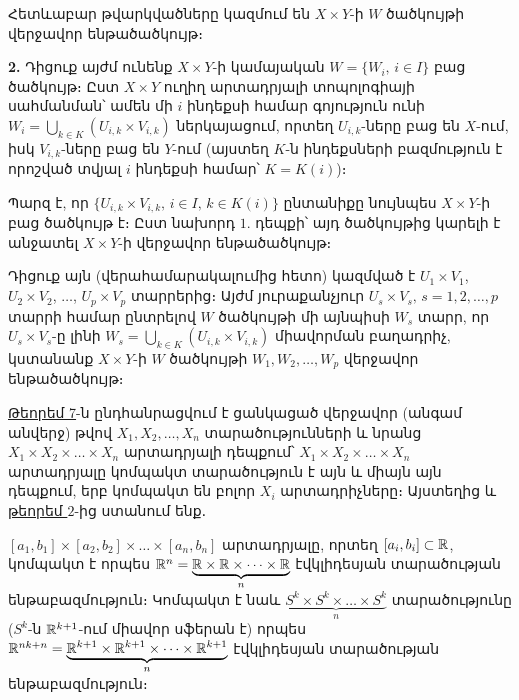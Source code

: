 \documentclass[./main.tex]{subfiles}
\begin{document}
\begin{varproof}
\par Հետևաբար թվարկվածները կազմում են $X \times Y$-ի $W$ ծածկույթի վերջավոր են\-թա\-ծածկույթ։

\par \textbf{2.} Դիցուք այժմ ունենք $X\times Y$-ի կամայական $W=\{ W_i,\, i\in I\}$ բաց ծածկույթ։ Ըստ $X\times Y$ ուղիղ արտադրյալի տոպոլոգիայի սահմանման՝ ամեն մի $i$ ինդեքսի համար գոյություն ունի $W_i=\bigcup\limits_{k\in K}(U_{i,k}\times V_{i,k})$ ներկայացում, որտեղ $U_{i,k}$-ները բաց են $X$-ում, իսկ $V_{i,k}$-ները բաց են $Y$-ում (այստեղ $K$-ն ինդեքսների բազմություն է որոշված տվյալ $i$ ինդեքսի համար՝ $K=K(i)$)։
\par Պարզ է, որ $\{U_{i,k}\times V_{i,k},\, i\in I,\, k\in K(i)\}$ ընտանիքը նույնպես $X\times Y$-ի բաց ծածկույթ է։ Ըստ նախորդ $1.$ դեպքի՝ այդ ծածկույթից կարելի է անջատել $X\times Y$-ի վերջավոր ենթածածկույթ։ 
\par Դիցուք այն (վերահամարակալումից հետո) կազմված է $U_1\times V_1$, $U_2\times V_2$, $\dots$, ${U_p\times V_p}$ տարրերից։ Այժմ յուրաքանչյուր $U_s\times V_s,\, s=1,2,\dots,p$ տարրի համար ընտ\-րե\-լով $W$ ծածկույթի մի այնպիսի $W_s$ տարր, որ $U_s\times V_s$-ը լինի ${W_s=\bigcup\limits_{k\in K}(U_{i,k}\times V_{i,k})}$ միա\-վորման բաղադրիչ, կստանանք $X\times Y$-ի $W$ ծածկույթի $W_1, W_2, \dots, W_p$ վեր\-ջա\-վոր ենթածածկույթ։
\end{varproof}

\par \hyperref[թեորեմ 7]{Թեորեմ 7}-ն ընդհանրացվում է ցանկացած վերջավոր (անգամ անվերջ) թվով $X_1,X_2,\dots,X_n$ տարածությունների և նրանց $X_1\times X_2\times \dots\times X_n $ արտադրյալի դեպքում՝ $X_1\times X_2\times \dots\times X_n$ արտադրյալը կոմպակտ տարածություն է այն և միայն այն դեպքում, երբ կոմպակտ են բոլոր $X_i$ արտադրիչները։ Այստեղից և \hyperref[թեորեմ 2]{թեորեմ $2$}-ից ստանում ենք․
\begin{hetevanq}\label{ch16cor4}
$[a_1,b_1]\times [a_2,b_2]\times \dots \times [a_n,b_n]$ արտադրյալը, որտեղ $[a_i,b_i]\subset \mathbb{R}$, կոմպակտ է որպես $\mathbb{R}^n=\underbrace{\mathbb{R}\times \mathbb{R} \times \dots \times \mathbb{R}}_\text{$n$}$ էվկլիդեսյան տարածության են\-թա\-բազ\-մու\-թյուն։ Կոմպակտ է նաև  $\underbrace{S^k\times S^k\times\dots\times S^k}_\text{$n$}$ տարածությունը ($S^k$-ն $\mathbb{R}^{k+1}$-ում մի\-ա\-վոր սֆե\-րան է) որպես $\mathbb{R}^{nk+n}=\underbrace{\mathbb{R}^{k+1}\times \mathbb{R}^{k+1}\times \dots \times \mathbb{R}^{k+1}}_\text{$n$}$ էվկլիդեսյան տա\-րա\-ծու\-թյան ենթաբազմություն։
\end{hetevanq}
\end{document}
